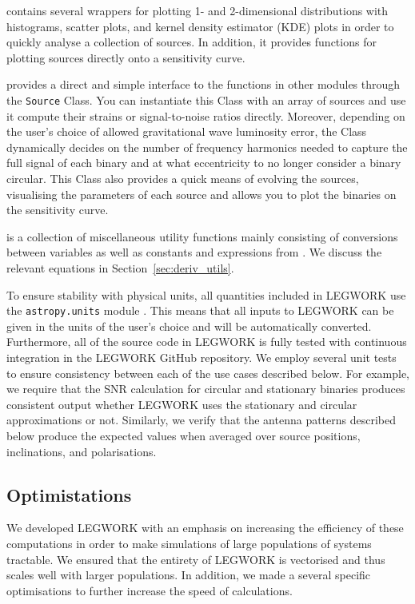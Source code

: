 \documentclass[twocolumn]{aastex631}
\newcommand{\lw}{LEGWORK}
\newcommand{\lwColour}{SeaGreen}
\newcommand{\lwModLink}[1]{\href{https://legwork.readthedocs.io/en/latest/modules.html\#module-legwork.#1}{\color{\lwColour}{\texttt{#1}}}}
\begin{document}
\lwModLink{visualisation} contains several wrappers for plotting 1- and 2-dimensional distributions with histograms, scatter plots, and kernel density estimator (KDE) plots in order to quickly analyse a collection of sources. In addition, it provides functions for plotting sources directly onto a sensitivity curve.

\lwModLink{source} provides a direct and simple interface to the functions in other modules through the \texttt{Source} Class. You can instantiate this Class with an array of sources and use it compute their strains or signal-to-noise ratios directly. Moreover, depending on the user's choice of allowed gravitational wave luminosity error, the Class dynamically decides on the number of frequency harmonics needed to capture the full signal of each binary and at what eccentricity to no longer consider a binary circular. This Class also provides a quick means of evolving the sources, visualising the parameters of each source and allows you to plot the binaries on the sensitivity curve.

\lwModLink{utils} is a collection of miscellaneous utility functions mainly consisting of conversions between variables as well as constants and expressions from \citet{Peters+1964}. We discuss the relevant equations in Section~\ref{sec:deriv_utils}.

To ensure stability with physical units, all quantities included in \lw{} use the \texttt{astropy.units} module \citep{AstropyCollaboration+2013, AstropyCollaboration+2018}. This means that all inputs to \lw{} can be given in the units of the user's choice and will be automatically converted. Furthermore, all of the source code in \lw{} is fully tested with continuous integration in the \lw{} GitHub repository. We employ several unit tests to ensure consistency between each of the use cases described below. For example, we require that the SNR calculation for circular and stationary binaries produces consistent output whether \lw{} uses the stationary and circular approximations or not. Similarly, we verify that the antenna patterns described below produce the expected values when averaged over source positions, inclinations, and polarisations.

\subsection{Optimistations}

We developed \lw{} with an emphasis on increasing the efficiency of these computations in order to make simulations of large populations of systems tractable. We ensured that the entirety of \lw{} is vectorised and thus scales well with larger populations. In addition, we made a several specific optimisations to further increase the speed of calculations.
\end{document}
